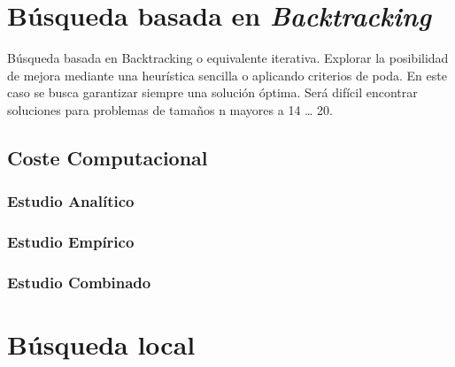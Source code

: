 \documentclass{uc3mpracticas}
\begin{document}
  \frontmatter



  \vspace{55mm}


  \newpage

  \tableofcontents

\newpage

  \mainmatter

  \section{Búsqueda basada en \textit{Backtracking}}

  Búsqueda basada en Backtracking o equivalente iterativa. Explorar la posibilidad de mejora mediante una heurística sencilla o aplicando criterios de poda. En este caso se busca garantizar siempre una solución óptima. Será difícil encontrar soluciones para problemas de tamaños n mayores a 14 … 20.

  \subsection{Coste Computacional}

  \subsubsection{Estudio Analítico}

  \subsubsection{Estudio Empírico}

  \subsubsection{Estudio Combinado}
  




  \section{Búsqueda local}
\end{document}
